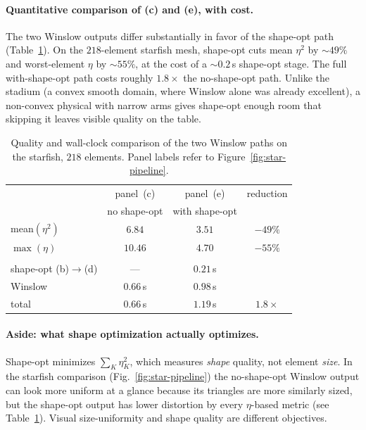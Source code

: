 \documentclass[11pt]{article}
\begin{document}
\paragraph{Quantitative comparison of (c) and (e), with cost.}
The two Winslow outputs differ substantially in favor of the
shape-opt path (Table~\ref{tab:starfish-comparison}). On the
$218$-element starfish mesh, shape-opt cuts mean $\eta^2$ by
$\sim 49\%$ and worst-element $\eta$ by $\sim 55\%$, at the cost
of a $\sim 0.2$\,s shape-opt stage. The full with-shape-opt path
costs roughly $1.8\times$ the no-shape-opt path. Unlike the
stadium (a convex smooth domain, where Winslow alone was already
excellent), a non-convex physical with narrow arms gives
shape-opt enough room that skipping it leaves visible quality on
the table.

\begin{table}[htbp]
  \centering
  \caption{Quality and wall-clock comparison of the two
  Winslow paths on the starfish, $218$ elements. Panel labels
  refer to Figure~\ref{fig:star-pipeline}.}
  \label{tab:starfish-comparison}
  \begin{tabular}{lccc}
    \toprule
    & panel~(c) & panel~(e) & reduction \\
    & no shape-opt & with shape-opt & \\
    \midrule
    mean$(\eta^2)$  & $6.84$  & $3.51$ & $-49\%$ \\
    $\max(\eta)$    & $10.46$ & $4.70$ & $-55\%$ \\
    \addlinespace
    \multicolumn{4}{l}{\textit{Wall-clock time:}} \\
    shape-opt (b)$\to$(d)  & ---       & $0.21$\,s & \\
    Winslow                 & $0.66$\,s & $0.98$\,s & \\
    total                   & $0.66$\,s & $1.19$\,s & $1.8\times$ \\
    \bottomrule
  \end{tabular}
\end{table}

\paragraph{Aside: what shape optimization actually optimizes.}
Shape-opt minimizes $\sum_K \eta_K^2$, which measures
\emph{shape} quality, not element \emph{size}. In the starfish
comparison (Fig.~\ref{fig:star-pipeline}) the no-shape-opt
Winslow output can look more uniform at a glance because its
triangles are more similarly sized, but the shape-opt output has
lower distortion by every $\eta$-based metric (see
Table~\ref{tab:starfish-comparison}). Visual size-uniformity and
shape quality are different objectives.
\end{document}
